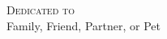 %
%
%
%
%
\cleardoublepage
\thispagestyle{empty}
\hspace{0pt}\vfill

\begin{center}
    \noindent
    \textsc{Dedicated to}\\
    Family, Friend, Partner, or Pet
\end{center}

\vfill\hspace{0pt}
\cleardoublepage
